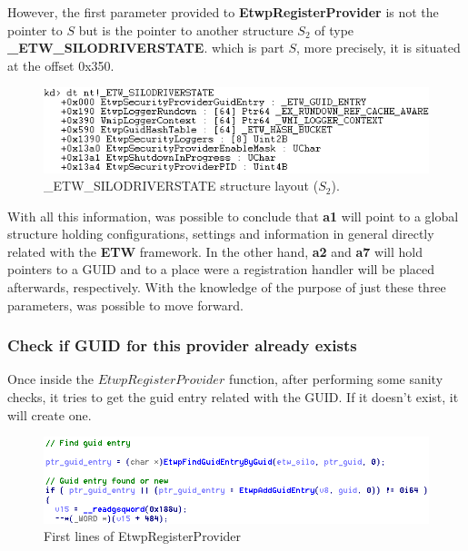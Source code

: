   However, the first parameter provided to {\bfseries EtwpRegisterProvider} is not the pointer to $S$ but is the pointer to another structure $S_2$ of type {\bfseries \_ETW\_SILODRIVERSTATE}. which is part $S$, more precisely, it is situated at the offset 0x350. 

  \begin{centering}
  \begin{figure}[H]
    \includegraphics[width=12cm]{images/ETW_SILODRIVERSTATE_structure.png}
    \caption[]{\_ETW\_SILODRIVERSTATE structure layout ($S_2$).}
    \label{fig:etwsilodriverstate_structure}
  \end{figure}
  \end{centering}

  With all this information, was possible to conclude that {\bfseries a1} will point to a global structure holding configurations, settings and information in general directly related with the {\bfseries ETW} framework. In the other hand, {\bfseries a2} and {\bfseries a7} will hold pointers to a GUID and to a place were a registration handler will be placed afterwards, respectively. 
  With the knowledge of the purpose of just these three parameters, was possible to move forward.








  \subsubsection{Check if GUID for this provider already exists}
  Once inside the $EtwpRegisterProvider$ function, after performing some sanity checks, it tries to get the guid entry related with the GUID. If it doesn't exist, it will create one. 
  
  \begin{centering}
  \begin{figure}[H]
    \includegraphics[width=15cm]{images/etwpregisterProvider.png}
    \caption[]{First lines of EtwpRegisterProvider}
    \label{fig:etwpregisterProvider}
  \end{figure}
  \end{centering}

